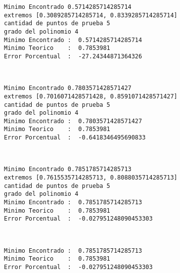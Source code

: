 \documentclass[11pt]{article}
\begin{document}
    \begin{Verbatim}[commandchars=\\\{\}]
Minimo Encontrado 0.5714285714285714
extremos [0.3089285714285714, 0.8339285714285714]
cantidad de puntos de prueba 5
grado del polinomio 4
Minimo Encontrado :  0.5714285714285714
Minimo Teorico    :  0.7853981
Error Porcentual  :  -27.24344871364326
    \end{Verbatim}

    \begin{center}
    \end{center}
    { \hspace*{\fill} \\}
    
    \begin{Verbatim}[commandchars=\\\{\}]
Minimo Encontrado 0.7803571428571427
extremos [0.7016071428571428, 0.8591071428571427]
cantidad de puntos de prueba 5
grado del polinomio 4
Minimo Encontrado :  0.7803571428571427
Minimo Teorico    :  0.7853981
Error Porcentual  :  -0.6418346495690833
    \end{Verbatim}

    \begin{center}
    \end{center}
    { \hspace*{\fill} \\}
    
    \begin{Verbatim}[commandchars=\\\{\}]
Minimo Encontrado 0.7851785714285713
extremos [0.7615535714285713, 0.8088035714285713]
cantidad de puntos de prueba 5
grado del polinomio 4
Minimo Encontrado :  0.7851785714285713
Minimo Teorico    :  0.7853981
Error Porcentual  :  -0.027951248090453303
    \end{Verbatim}

    \begin{center}
    \end{center}
    { \hspace*{\fill} \\}
    
    \begin{Verbatim}[commandchars=\\\{\}]
Minimo Encontrado :  0.7851785714285713
Minimo Teorico    :  0.7853981
Error Porcentual  :  -0.027951248090453303
    \end{Verbatim}
\end{document}
